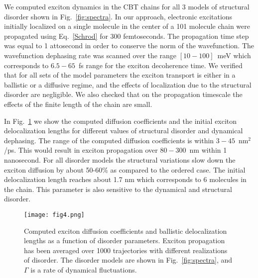 \documentclass[journal=jacs,manuscript=article]{achemso}
\begin{document}
We computed exciton dynamics in the CBT chains for all 3 models of structural disorder shown in Fig.~\ref{fig:spectra}. In our approach, electronic excitations initially localized on a single molecule in the center of a 101 molecule chain were propagated using Eq.~\ref{Schrod} for 300 femtoseconds. The propagation time step was equal to 1 attosecond in order to conserve the norm of the wavefunction. The wavefunction dephasing rate was scanned over the range $[10-100]$~meV which corresponds to $6.5-65$~fs range for the exciton decoherence time. We verified that for all sets of the model parameters the exciton transport is either in a ballistic or a diffusive regime, and the effects of localization due to the structural disorder are negligible. We also checked that on the propagation timescale the effects of the finite length of the chain are small.

In Fig.~\ref{fig:diffusion} we show the computed diffusion coefficients and the initial exciton delocalization lengths for different values of structural disorder and dynamical dephasing. The range of the computed diffusion coefficients is within $3-45$~nm$^2$/ps. This would result in exciton propagation over $80-300$~nm within 1 nanosecond. For all disorder models the structural variations slow down the exciton diffusion by about 50-60\% as compared to the ordered case. The initial delocalization length reaches about 1.7 nm which corresponds to 6 molecules in the chain. This parameter is also sensitive to the dynamical and structural disorder.
\begin{figure}
\begin{center}
\texttt{[image: fig4.png]}
\caption{Computed exciton diffusion coefficients and ballistic delocalization lengths as a function of disorder parameters. Exciton propagation has been averaged over 1000 trajectories with different realizations of disorder. The disorder models are shown in Fig.~\ref{fig:spectra}, and $\Gamma$ is a rate of dynamical fluctuations.}
\label{fig:diffusion}
\end{center}
\end{figure}
\end{document}
